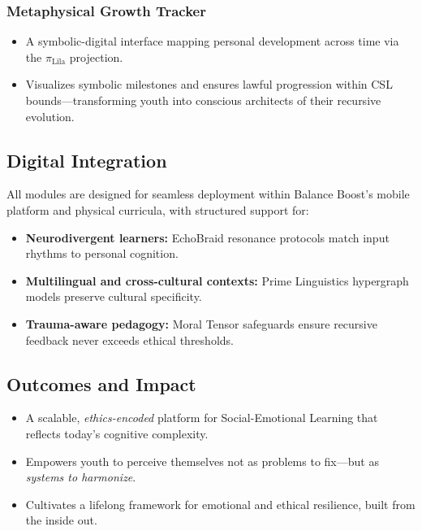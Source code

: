 \documentclass[11pt]{article}
\begin{document}
\subsubsection{Metaphysical Growth Tracker}

\begin{itemize}
  \item A symbolic-digital interface mapping personal development across time via the \(\pi_{\text{Līla}}\) projection.
  \item Visualizes symbolic milestones and ensures lawful progression within CSL bounds—transforming youth into conscious architects of their recursive evolution.
\end{itemize}

\subsection{Digital Integration}

All modules are designed for seamless deployment within Balance Boost's mobile platform and physical curricula, with structured support for:

\begin{itemize}
  \item \textbf{Neurodivergent learners:} EchoBraid resonance protocols match input rhythms to personal cognition.
  \item \textbf{Multilingual and cross-cultural contexts:} Prime Linguistics hypergraph models preserve cultural specificity.
  \item \textbf{Trauma-aware pedagogy:} Moral Tensor safeguards ensure recursive feedback never exceeds ethical thresholds.
\end{itemize}

\subsection{Outcomes and Impact}

\begin{itemize}
  \item A scalable, \textit{ethics-encoded} platform for Social-Emotional Learning that reflects today’s cognitive complexity.
  \item Empowers youth to perceive themselves not as problems to fix—but as \textit{systems to harmonize}.
  \item Cultivates a lifelong framework for emotional and ethical resilience, built from the inside out.
\end{itemize}
\end{document}
